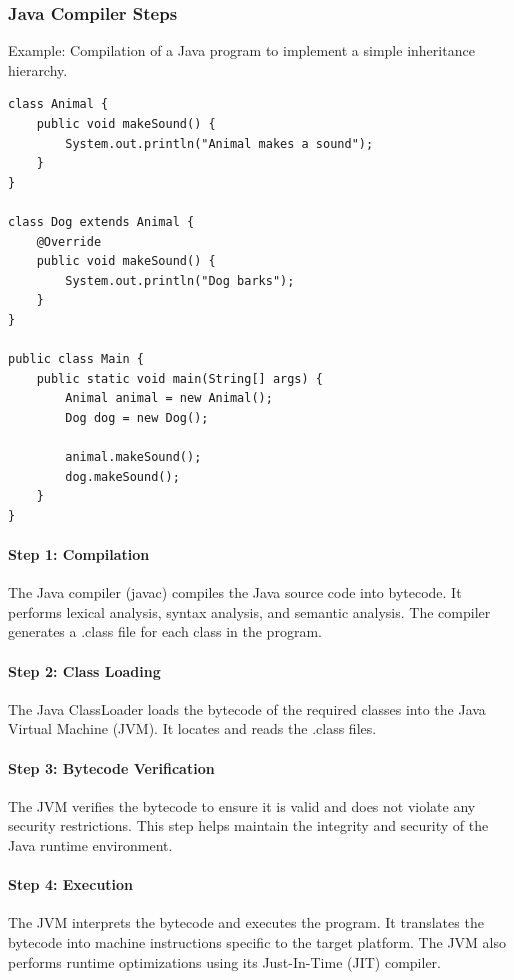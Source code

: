 \documentclass[12pt]{article}
\begin{document}
\subsubsection*{Java Compiler Steps}
Example: Compilation of a Java program to implement a simple inheritance hierarchy.

\begin{lstlisting}
class Animal {
    public void makeSound() {
        System.out.println("Animal makes a sound");
    }
}

class Dog extends Animal {
    @Override
    public void makeSound() {
        System.out.println("Dog barks");
    }
}

public class Main {
    public static void main(String[] args) {
        Animal animal = new Animal();
        Dog dog = new Dog();

        animal.makeSound();
        dog.makeSound();
    }
}
\end{lstlisting}

\paragraph*{Step 1: Compilation}
The Java compiler (javac) compiles the Java source code into bytecode. It performs lexical analysis, syntax analysis, and semantic analysis. The compiler generates a .class file for each class in the program.

\paragraph*{Step 2: Class Loading}
The Java ClassLoader loads the bytecode of the required classes into the Java Virtual Machine (JVM). It locates and reads the .class files.

\paragraph*{Step 3: Bytecode Verification}
The JVM verifies the bytecode to ensure it is valid and does not violate any security restrictions. This step helps maintain the integrity and security of the Java runtime environment.

\paragraph*{Step 4: Execution}
The JVM interprets the bytecode and executes the program. It translates the bytecode into machine instructions specific to the target platform. The JVM also performs runtime optimizations using its Just-In-Time (JIT) compiler.
\end{document}
